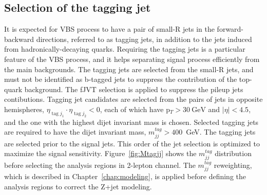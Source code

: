\subsection{Selection of the tagging jet}
It is expected for VBS process to have a pair of small-R jets in the forward-backward directions, referred to as tagging jets, in addition to the jets induced from hadronically-decaying quarks.
Requiring the tagging jets is a particular feature of the VBS process, and it helps separating signal process efficiently from the main backgrounds.
The tagging jets are selected from the small-R jets, and must not be identified as b-tagged jets to suppress the contribution of the top-quark background. 
The fJVT selection is applied to suppress the pileup jets contibutions. Tagging jet candidates are selected from the pairs of jets in opposite hemispheres, $\eta_{\operatorname{tag} j_{1}} \cdot \eta_{\operatorname{tag} j_{2}}<0$, each of which have p$_T > 30~\mathrm{GeV}$ and $|\eta| < 4.5$, and the one with the highest dijet invariant mass is chosen.  
Selected tagging jets are required to have the dijet invariant mass, $m^{tag}_{jj} > 400$~GeV.
The tagging jets are selected prior to the signal jets. This order of the jet selection is optimized to maximize the signal sensitivity.
Figure~\ref{fig:Mtagjj} shows the $m^{tag}_{jj}$ distribution before selecting the analysis regions in 2-lepton channel.
The $m^{tag}_{jj}$ reweighting, which is described in Chapter~\ref{chap:modeling}, is applied before defining the analysis regions to correct the Z+jet modeling.
